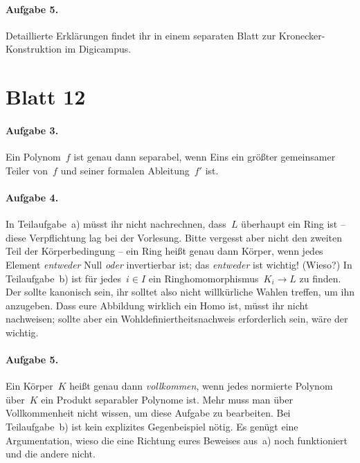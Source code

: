 \documentclass{algblatt}
\newcommand{\hint}[1]{\rotatebox{180}{\vbox{\textcolor{grey}{#1}}}}
\begin{document}
\paragraph{Aufgabe 5.} Detaillierte Erklärungen findet ihr in einem separaten
Blatt zur Kronecker-Konstruktion im Digicampus.


\section*{Blatt 12}

\paragraph{Aufgabe 3.} Ein Polynom~$f$ ist genau dann separabel, wenn Eins ein
größter gemeinsamer Teiler von~$f$ und seiner formalen Ableitung~$f'$ ist.

\hint{In Algebra~I wurde bewiesen, dass jedes irreduzible Polynom über~$\QQ$
schon separabel ist. Den damaligen Beweis kann man in Teilaufgabe~a)
imitieren.}

\paragraph{Aufgabe 4.} In Teilaufgabe~a) müsst ihr nicht nachrechnen, dass~$L$
überhaupt ein Ring ist -- diese Verpflichtung lag bei der Vorlesung. Bitte
vergesst aber nicht den zweiten Teil der Körperbedingung -- ein Ring heißt
genau dann Körper, wenn jedes Element \emph{entweder} Null \emph{oder}
invertierbar ist; das \emph{entweder} ist wichtig! (Wieso?)
In Teilaufgabe~b) ist für jedes~$i \in I$ ein
Ringhomomorphismus~$K_i \to L$ zu finden. Der sollte kanonisch sein, ihr
solltet also nicht willkürliche Wahlen treffen, um ihn anzugeben. Dass eure
Abbildung wirklich ein Homo ist, müsst ihr nicht nachweisen; sollte aber ein
Wohldefiniertheitsnachweis erforderlich sein, wäre der wichtig.

\paragraph{Aufgabe 5.} Ein Körper~$K$ heißt genau dann \emph{vollkommen}, wenn
jedes normierte Polynom über~$K$ ein Produkt separabler Polynome ist. Mehr muss
man über Vollkommenheit nicht wissen, um diese Aufgabe zu bearbeiten.
Bei Teilaufgabe~b) ist kein explizites Gegenbeispiel
nötig. Es genügt eine Argumentation, wieso die eine Richtung eures Beweises
aus~a) noch funktioniert und die andere nicht.
\end{document}
